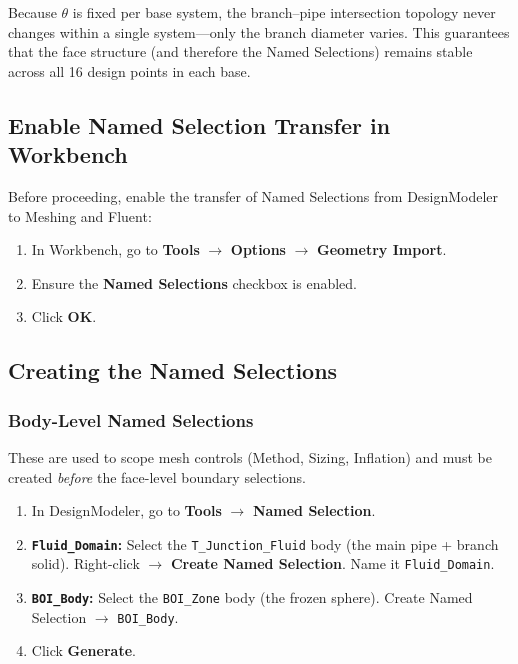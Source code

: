 \documentclass[12pt,a4paper]{report}
\begin{document}
Because $\theta$ is fixed per base system, the branch--pipe intersection
topology never changes within a single system---only the branch diameter
varies.  This guarantees that the face structure (and therefore the Named
Selections) remains stable across all 16 design points in each base.

\subsection{Enable Named Selection Transfer in Workbench}

Before proceeding, enable the transfer of Named Selections from
DesignModeler to Meshing and Fluent:

\begin{enumerate}
  \item In Workbench, go to \textbf{Tools} $\rightarrow$
        \textbf{Options} $\rightarrow$ \textbf{Geometry Import}.
  \item Ensure the \textbf{Named Selections} checkbox is enabled.
  \item Click \textbf{OK}.
\end{enumerate}

\subsection{Creating the Named Selections}

\subsubsection{Body-Level Named Selections}

These are used to scope mesh controls (Method, Sizing, Inflation) and
must be created \emph{before} the face-level boundary selections.

\begin{enumerate}
  \item In DesignModeler, go to \textbf{Tools} $\rightarrow$
        \textbf{Named Selection}.
  \item \textbf{\texttt{Fluid\_Domain}:} Select the
        \texttt{T\_Junction\_Fluid} body (the main pipe + branch solid).
        Right-click $\rightarrow$ \textbf{Create Named Selection}.
        Name it \texttt{Fluid\_Domain}.
  \item \textbf{\texttt{BOI\_Body}:} Select the \texttt{BOI\_Zone} body
        (the frozen sphere).  Create Named Selection $\rightarrow$
        \texttt{BOI\_Body}.
  \item Click \textbf{Generate}.
\end{enumerate}
\end{document}
